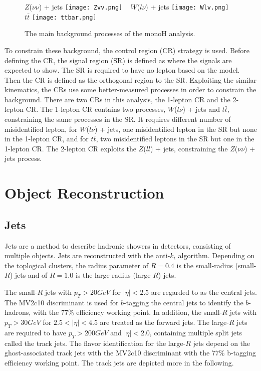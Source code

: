 \documentclass[class=NTHU_thesis, crop=false]{standalone}
\begin{document}
\begin{figure}[!hbt]
	\captionsetup[subfigure]{labelformat=empty}
	\centering
	\subcaptionbox
	{$Z$($\nu\nu$) + jets
		\label{fig:subfig_fig1}}
	{\texttt{[image: Zvv.png]}}
	~
	\subcaptionbox
	{$W$($l\nu$) + jets
		\label{fig:subfig_fig2}}
	{\texttt{[image: Wlv.png]}}
	~
	\subcaptionbox
	{$t\bar{t}$
		\label{fig:subfig_fig3}}
	{\texttt{[image: ttbar.png]}}
	\caption{The main background processes of the monoH analysis.}
	\label{fig:label}
\end{figure}

To constrain these background, the control region (CR) strategy is used. Before defining the CR, the signal region (SR) is defined as where the signals are expected to show. The SR is required to have no lepton based on the model. Then the CR is defined as the orthogonal region to the SR. Exploiting the similar kinematics, the CRs use some better-measured processes in order to constrain the background. There are two CRs in this analysis, the 1-lepton CR and the 2-lepton CR. The 1-lepton CR contains two processes, $W$($l\nu$) + jets and $t\bar{t}$, constraining the same processes in the SR. It requires different number of misidentified lepton, for $W$($l\nu$) + jets, one misidentified lepton in the SR but none in the 1-lepton CR, and for $t\bar{t}$, two misidentified leptons in the SR but one in the 1-lepton CR. The 2-lepton CR exploits the $Z$($ll$) + jets, constraining the $Z$($\nu\nu$) + jets process.

\section{Object Reconstruction}
\subsection{Jets}
Jets are a method to describe hadronic showers in detectors, consisting of multiple objects. Jets are reconstructed with the anti-$k_t$ algorithm. Depending on the toplogical clusters, the radius parameter of $R = 0.4$ is the small-radius (small-$R$) jets and of $R = 1.0$ is the large-radius (large-$R$) jets.

The small-$R$ jets with $p_T > 20 GeV$ for $\left|\eta\right| < 2.5$ are regarded to as the central jets. The MV2c10 discriminant is used for $b$-tagging the central jets to identify the $b$-hadrons, with the 77\% efficiency working point. In addition, the small-$R$ jets with $p_T > 30 GeV$ for $2.5 < \left|\eta\right| < 4.5$ are treated as the forward jets. The large-$R$ jets are required to have $p_T > 200 GeV$ and $\left|\eta\right| < 2.0$, containing multiple split jets called the track jets. The flavor identification for the large-$R$ jets depend on the ghost-associated track jets with the MV2c10 discriminant with the 77\% b-tagging efficiency working point. The track jets are depicted more in the following.
\end{document}
